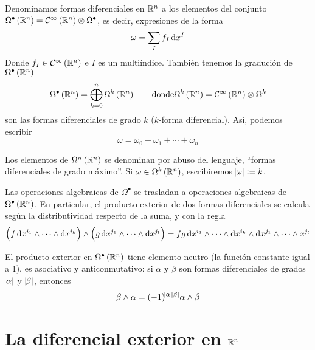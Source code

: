 \begin{defi}
    Denominamos formas diferenciales en $\mathbb{R}^n$ a los elementos del conjunto $\Omega^\bullet\left( \mathbb{R}^n \right) = \mathcal{C}^\infty\left( \mathbb{R}^n \right) \otimes
    \Omega^\bullet$, es decir, expresiones de la forma
    \[
        \omega = \sum_I f_I \dif x^I
    \]
    Donde $f_I \in \mathcal{C}^{\infty}\left( \mathbb{R}^n \right)$ e $I$ es un multiíndice. Tambi\'en tenemos la gradución de $\Omega^\bullet \left( \mathbb{R}^n \right)$
    \[
        \Omega^\bullet \left( \mathbb{R}^n \right) = \bigoplus^n_{k=0} \Omega^k \left( \mathbb{R}^n \right) \qquad \text{donde}
        \Omega^k \left( \mathbb{R}^n \right) = \mathcal{C}^\infty \left( \mathbb{R}^n \right) \otimes \Omega^k
    \]
    son las formas diferenciales de grado $k$ ($k$-forma diferencial). Así, podemos escribir
    \[
        \omega = \omega_0 + \omega_1 + \cdots + \omega_n
    \]

    Los elementos de $\Omega^n\left( \mathbb{R}^n \right)$ se denominan por abuso del lenguaje, ``formas diferenciales de grado máximo''. Si
    $\omega \in \Omega^k \left( \mathbb{R}^n \right)$, escribiremos $\abs{\omega} := k$.
\end{defi}

\begin{defi}
    Las operaciones algebraicas de $\Omega^\bullet$ se trasladan a operaciones algebraicas de $\Omega^\bullet \left( \mathbb{R}^n \right)$. En particular,
    el producto exterior de dos formas diferenciales se calcula según la distributividad respecto de la suma, y con la regla
    \[
        \left( f \dif x^{i_1} \wedge \cdots \wedge \dif x^{i_k} \right) \wedge \left( g \dif x^{j_1} \wedge \cdots \wedge \dif x^{j_l} \right) =
        fg \dif x^{i_1} \wedge \cdots \wedge \dif x^{i_k} \wedge \dif x^{j_1} \wedge \cdots \wedge x^{j_l}
    \]
\end{defi}

\begin{prop}
    El producto exterior en $\Omega^\bullet \left( \mathbb{R}^n \right)$ tiene elemento neutro (la función constante igual a 1), es asociativo
    y anticonmutativo: si $\alpha$ y $\beta$ son formas diferenciales de grados $\abs{\alpha}$ y $\abs{\beta}$, entonces
    \[
        \beta \wedge \alpha = (-1)^{\abs{\alpha}\abs{\beta}} \alpha \wedge \beta
    \]
\end{prop}

\section{La diferencial exterior en $\mathbb{R}^n$}

